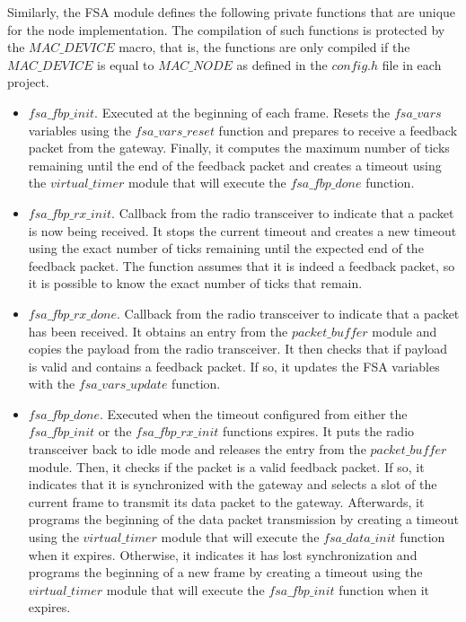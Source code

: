 Similarly, the FSA module defines the following private functions that are unique for the node implementation. The compilation of such functions is protected by the $MAC\_DEVICE$ macro, that is, the functions are only compiled if the $MAC\_DEVICE$ is equal to $MAC\_NODE$ as defined in the $config.h$ file in each project.
\begin{itemize}
\item $fsa\_fbp\_init$. Executed at the beginning of each frame. Resets the $fsa\_vars$ variables using the $fsa\_vars\_reset$ function and prepares to receive a feedback packet from the gateway. Finally, it computes the maximum number of ticks remaining until the end of the feedback packet and creates a timeout using the $virtual\_timer$ module that will execute the $fsa\_fbp\_done$ function.
\item $fsa\_fbp\_rx\_init$. Callback from the radio transceiver to indicate that a packet is now being received. It stops the current timeout and creates a new timeout using the exact number of ticks remaining until the expected end of the feedback packet. The function assumes that it is indeed a feedback packet, so it is possible to know the exact number of ticks that remain.
\item $fsa\_fbp\_rx\_done$. Callback from the radio transceiver to indicate that a packet has been received. It obtains an entry from the $packet\_buffer$ module and copies the payload from the radio transceiver. It then checks that if payload is valid and contains a feedback packet. If so, it updates the FSA variables with the $fsa\_vars\_update$ function.
\item $fsa\_fbp\_done$. Executed when the timeout configured from either the $fsa\_fbp\_init$ or the $fsa\_fbp\_rx\_init$ functions expires. It puts the radio transceiver back to idle mode and releases the entry from the $packet\_buffer$ module. Then, it checks if the packet is a valid feedback packet. If so, it indicates that it is synchronized with the gateway and selects a slot of the current frame to transmit its data packet to the gateway. Afterwards, it programs the beginning of the data packet transmission by creating a timeout using the $virtual\_timer$ module that will execute the $fsa\_data\_init$ function when it expires. Otherwise, it indicates it has lost synchronization and programs the beginning of a new frame by creating a timeout using the $virtual\_timer$ module that will execute the $fsa\_fbp\_init$ function when it expires.


\end{itemize}
